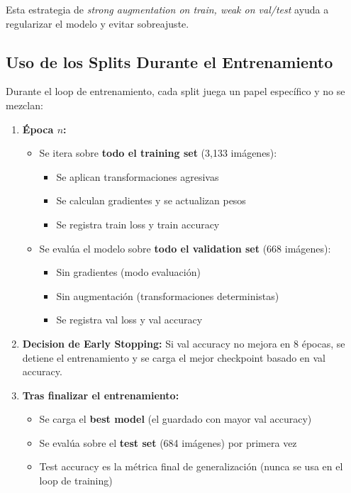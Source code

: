\documentclass[11pt,a4paper]{article}
\begin{document}
Esta estrategia de \textit{strong augmentation on train, weak on val/test} ayuda a regularizar el modelo y evitar sobreajuste.

\subsection{Uso de los Splits Durante el Entrenamiento}

Durante el loop de entrenamiento, cada split juega un papel específico y no se mezclan:

\begin{enumerate}
    \item \textbf{Época $n$:}
    \begin{itemize}
        \item Se itera sobre \textbf{todo el training set} (3,133 imágenes):
        \begin{itemize}
            \item Se aplican transformaciones agresivas
            \item Se calculan gradientes y se actualizan pesos
            \item Se registra train loss y train accuracy
        \end{itemize}
        \item Se evalúa el modelo sobre \textbf{todo el validation set} (668 imágenes):
        \begin{itemize}
            \item Sin gradientes (modo evaluación)
            \item Sin augmentación (transformaciones deterministas)
            \item Se registra val loss y val accuracy
        \end{itemize}
    \end{itemize}
    
    \item \textbf{Decision de Early Stopping:} Si val accuracy no mejora en 8 épocas, se detiene el entrenamiento y se carga el mejor checkpoint basado en val accuracy.
    
    \item \textbf{Tras finalizar el entrenamiento:}
    \begin{itemize}
        \item Se carga el \textbf{best model} (el guardado con mayor val accuracy)
        \item Se evalúa sobre el \textbf{test set} (684 imágenes) por primera vez
        \item Test accuracy es la métrica final de generalización (nunca se usa en el loop de training)
    \end{itemize}
\end{enumerate}
\end{document}
